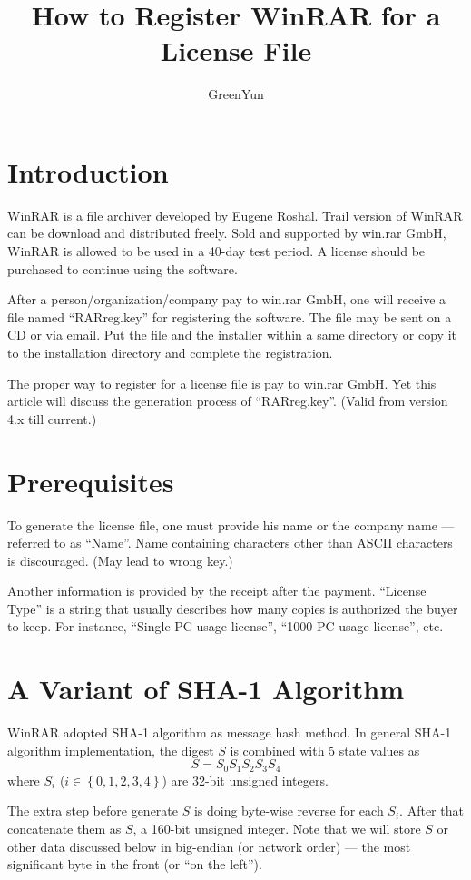 \documentclass[oneside]{article}
\begin{document}
\title{How to Register WinRAR for a License File}
\author{GreenYun}
\maketitle

\section{Introduction}
WinRAR is a file archiver developed by Eugene Roshal.
Trail version of WinRAR can be download and distributed freely.
Sold and supported by win.rar GmbH, WinRAR is allowed to be used in a 40-day test period.
A license should be purchased to continue using the software.

After a person/organization/company pay to win.rar GmbH, one will receive a file named ``RARreg.key'' for registering the software.
The file may be sent on a CD or via email. Put the file and the installer within a same directory or copy it to the installation directory and complete the registration.

The proper way to register for a license file is pay to win.rar GmbH.
Yet this article will discuss the generation process of ``RARreg.key''. (Valid from version 4.x till current.)

\section{Prerequisites}
To generate the license file, one must provide his name or the company name --- referred to as ``Name''. Name containing characters other than ASCII characters is discouraged. (May lead to wrong key.)

Another information is provided by the receipt after the payment.
``License Type'' is a string that usually describes how many copies is authorized the buyer to keep.
For instance, ``Single PC usage license'', ``1000 PC usage license'', etc.

\section{A Variant of SHA-1 Algorithm}\label{SHA-1}
WinRAR adopted SHA-1 algorithm as message hash method. In general SHA-1 algorithm implementation, the digest $S$ is combined with 5 state values as
\[S=S_0S_1S_2S_3S_4\]
where $S_i$ ($i\in\left\{0,1,2,3,4\right\}$) are 32-bit unsigned integers.

The extra step before generate $S$ is doing byte-wise reverse for each $S_i$. After that concatenate them as $S$, a 160-bit unsigned integer. Note that we will store $S$ or other data discussed below in big-endian (or network order) --- the most significant byte in the front (or ``on the left'').
\end{document}

